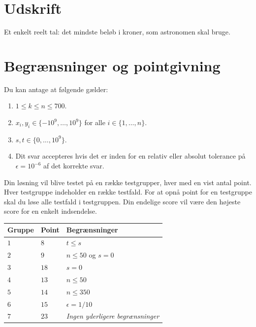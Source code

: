 \section*{Udskrift}

Et enkelt reelt tal: det mindste beløb i kroner, som astronomen skal bruge.

\section*{Begrænsninger og pointgivning}

Du kan antage at følgende gælder:
\begin{enumerate}
\item $1\leq k\leq n\leq 700$. %
\item $x_i, y_i\in \{-10^9,\ldots, 10^9\}$ for alle $i\in\{1,\ldots,n\}$. %
\item $s,t\in \{0,\ldots, 10^9\}$. %
\item Dit svar accepteres hvis det er inden for en relativ eller absolut tolerance på $\epsilon = 10^{-6}$ af det korrekte svar.
\end{enumerate}

Din løsning vil blive testet på en række testgrupper, hver med en vist antal point.
Hver testgruppe indeholder en række testfald.
For at opnå point for en testgruppe skal du løse alle testfald i testgruppen.
Din endelige score vil være den højeste score for en enkelt indsendelse.

\medskip
\noindent
\begin{tabular}{lll}
Gruppe & Point & Begrænsninger\\\hline
$1$ & $8$ & $t\leq s$\\
$2$ & $9$ & $n\leq 50$ og $s=0$\\
$3$ & $18$ & $s=0$\\
$4$ & $13$ & $n\leq 50$\\
$5$ & $14$ & $n\leq 350$\\
$6$ & $15$ & $\epsilon = 1/10$\\
$7$ & $23$ & \emph{Ingen yderligere begrænsninger}
\end{tabular}
